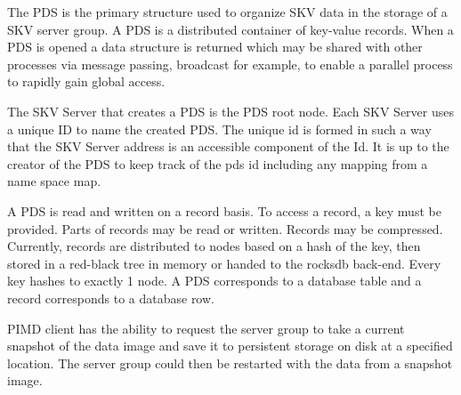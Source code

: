 \documentclass[a4paper, 10pt]{article}
\begin{document}
The PDS is the primary structure used to organize SKV data in the
storage of a SKV server group.  A PDS is a distributed container of
key-value records.  When a PDS is opened a data structure is returned
which may be shared with other processes via message passing,
broadcast for example, to enable a parallel process to rapidly gain
global access.

The SKV Server that creates a PDS is the PDS root node.  Each SKV
Server uses a unique ID to name the created PDS.  The unique id is
formed in such a way that the SKV Server address is an accessible
component of the Id.  It is up to the creator of the PDS to keep track
of the pds id including any mapping from a name space map.

A PDS is read and written on a record basis.  To access a record, a
key must be provided.  Parts of records may be read or written.
Records may be compressed.  Currently, records are distributed to
nodes based on a hash of the key, then stored in a red-black tree in
memory or handed to the rocksdb back-end.  Every key hashes to exactly
1 node.  A PDS corresponds to a database table and a record
corresponds to a database row.

PIMD client has the ability to request the server group to take a
current snapshot of the data image and save it to persistent storage
on disk at a specified location.  The server group could then be
restarted with the data from a snapshot image.






\end{document}
